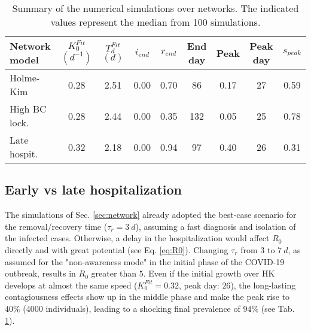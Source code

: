 \documentclass[DIV=12, BCOR=0pt]{scrartcl}  %
\begin{document}
	\begin{table}[h]
		\centering
		\caption{Summary of the numerical simulations over networks. The indicated values represent the median from 100 simulations.}
		\label{tab:lock_results}
		\begin{tabular}{lcccccccc}
			\toprule
			Network model & $K_0^{Fit}$ $(d^{-1})$ & $T_d^{Fit}$ $(d)$ & $i_{end}$ & $r_{end}$ & End day & Peak  & Peak day & $s_{peak}$\\
			\midrule
			Holme-Kim 		&    0.28 &   2.51 &  0.00 &  0.70 &  	 86 &  0.17 &   27 &	0.59 \\
			High BC lock.	&    0.28 &   2.44 &  0.00 &  0.35 & 		132 &  0.05 &   25 &	0.78 \\
			Late hospit.  & 	 0.32 &   2.18 &  0.00 &  0.94 &     97 &  0.40 &   26 &  0.31 \\
			
			\bottomrule
		\end{tabular}
	\end{table}
	
	
	\subsection{Early vs late hospitalization}
	The simulations of Sec. \ref{sec:network} already adopted the best-case scenario for the removal/recovery time ($\tau_{r} = 3 \ d$), assuming a fast diagnosis and isolation of the infected cases. 
	Otherwise, a delay in the hospitalization would affect $R_0$ directly and with great potential (see Eq. \ref{eq:R0}). Changing $\tau_{r}$ from $3$ to $7 \ d$, as assumed for the "non-awareness mode" in the initial phase of the COVID-19 outbreak, results in $R_0$ greater than $5$. Even if the initial growth over HK develops at almost the same speed ($K^{Fit}_0 = 0.32$, peak day: $26$), the long-lasting contagiousness effects show up in the middle phase and make the peak rise to $40 \%$ (4000 individuals), leading to a shocking final prevalence of $94 \%$ (see Tab. \ref{tab:lock_results}). 
	
\end{document}
